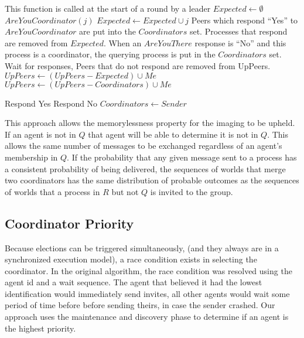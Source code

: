 \begin{algorithmic}[1]
\small
{}
    \State This function is called at the start of a round by a leader
        \Return
    \EndIf
    \State $Expected \gets \emptyset$
        \State $AreYouCoordinator(j)$
        \State $Expected \gets Expected \cup j$
    \EndFor
    \State Peers which respond ``Yes'' to $AreYouCoordinator$ are put into the $Coordinators$ set.
    \State Processes that respond are removed from $Expected$.
    \State When an $AreYouThere$ response is ``No'' and this process is a coordinator, the querying process is put in the $Coordinators$ set.
    \State Wait for responses, Peers that do not respond are removed from UpPeers.
    \State $UpPeers \gets (UpPeers-Expected) \cup {Me}$
    \State $UpPeers \gets (UpPeers-Coordinators) \cup {Me}$
        \Return
    \EndIf
        \State
    \EndIf
\EndFunction

\State

        \State Respond Yes
    \Else
        \State Respond No
        \State $Coordinators \gets Sender$
    \EndIf
\EndFunction
\end{algorithmic}

This approach allows the memorylessness property for the imaging to be upheld. If an agent is not in $Q$ that agent will be able to determine it is not in $Q$. This allows the same number of messages to be exchanged regardless of an agent's membership in $Q$. If the probability that any given message sent to a process has a consistent probability of being delivered, the sequences of worlds that merge two coordinators has the same distribution of probable outcomes as the sequences of worlds that a process in $R$ but not $Q$ is invited to the group.


\subsection{Coordinator Priority}

Because elections can be triggered simultaneously, (and they always are in a synchronized execution model), a race condition exists in selecting the coordinator. In the original algorithm, the race condition was resolved using the agent id and a wait sequence. The agent that believed it had the lowest identification would immediately send invites, all other agents would wait some period of time before before sending theirs, in case the sender crashed. Our approach uses the maintenance and discovery phase to determine if an agent is the highest priority.

